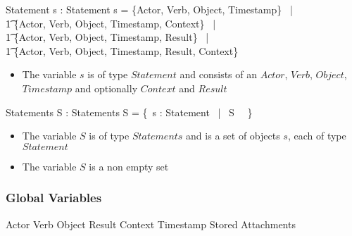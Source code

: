 \documentclass{article}
\begin{document}
  \begin{schema}{Statement}
    s : Statement
    \where
    s = \{Actor, Verb, Object, Timestamp\} \, |
    \\ \t1 \{Actor, Verb, Object, Timestamp, Context\} \, |
    \\ \t1 \{Actor, Verb, Object, Timestamp, Result\} \, |
    \\ \t1 \{Actor, Verb, Object, Timestamp, Result, Context\}
  \end{schema}
  \begin{itemize}
  \item The variable $s$ is of type $Statement$ and consists of an $Actor$, $Verb$, $Object$, $Timestamp$ and optionally $Context$ and $Result$
  \end{itemize}
  \begin{schema}{Statements}
    S : Statements
    \where
    S = \{~s : Statement \, | \, S \, \neg \, \emptyset\} \\

  \end{schema}
  \begin{itemize}
  \item The variable $S$ is of type $Statements$ and is a set of objects $s$, each of type $Statement$
 \item The variable $S$ is a non empty set
 \end{itemize}

 \subsubsection{Global Variables}
 Actor Verb Object Result Context Timestamp Stored Attachments
\end{document}
